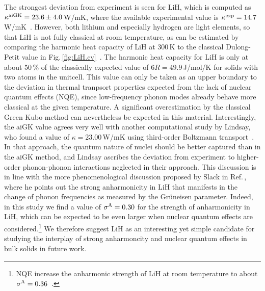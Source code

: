The strongest deviation from experiment is seen for LiH, which is computed as $\kappa^{\rm aiGK} = 23.6 \pm 4.0$\,W/mK, where the available experimental value is $\kappa^{\rm exp} = 14.7$\,W/mK~\cite{slack1973}. However, both lithium and especially hydrogen are light elements, so that LiH is not fully classical at room temperature, as can be estimated by comparing the harmonic heat capacity of LiH at 300\,K to the classical Dulong-Petit value in Fig.\,\ref{fig:LiH.cv}~\cite{Dove}. The harmonic heat capacity for LiH is only at about 50\,\% of the classically expected value of $6 R = 49.9$\,J/mol/K for solids with two atoms in the unitcell. This value can only be taken as an upper boundary to the deviation in thermal tranpsort properties expected from the lack of nuclear quantum effects (NQE), since low-frequency phonon modes already behave more classical at the given temperature.  A significant overestimation by the classical Green Kubo method can nevertheless be expected in this material. Interestingly, the aiGK value agrees very well with another computational study by Lindsay, who found a value of $\kappa = 23.00$\,W/mK using third-order Boltzmann transport~\cite{lindsay2016}. In that approach, the quantum nature of nuclei should be better captured than in the aiGK method, and Lindsay ascribes the deviation from experiment to higher-order phonon-phonon interactions neglected in their approach. This discussion is in line with the more phenomenological discussion proposed by Slack in Ref.\,\cite{slack1973}, where he points out the strong anharmonicity in LiH that manifests in the change of phonon frequencies as measured by the Gr\"uneisen parameter. Indeed, in this study we find a value of $\sigma^\mathrm{A} = 0.30$ for the strength of anharmonicity in LiH, which can be expected to be even larger when nuclear quantum effects are considered.\footnote{NQE increase the anharmonic strength of LiH at room temperature to about $\sigma^\mathrm{A} = 0.36$~\cite{hengst1}.} We therefore suggest LiH as an interesting yet simple candidate for studying the interplay of strong anharmoncity and nuclear quantum effects in bulk solids in future work.


